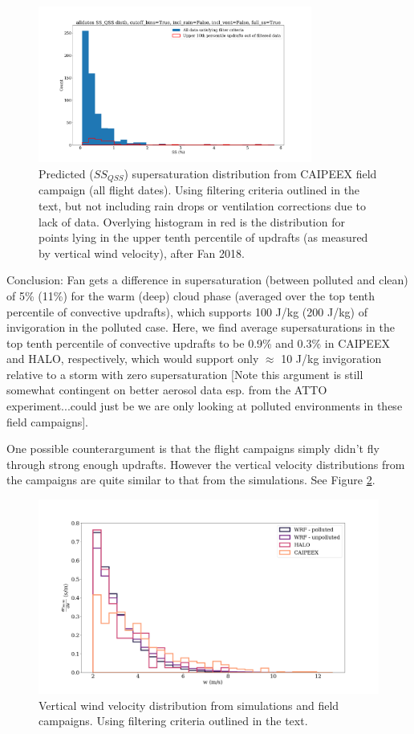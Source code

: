\documentclass{article}
\begin{document}
\begin{figure}[ht]
    \centering
    \includegraphics[width=9cm]{revcaipeex/v10_with_up10perc_ss_qss_hist_alldates_figure.png}
    \caption{Predicted ($SS_{QSS}$) supersaturation distribution from CAIPEEX field campaign (all flight dates). Using filtering criteria outlined in the text, but not including rain drops or ventilation corrections due to lack of data. Overlying histogram in red is the distribution for points lying in the upper tenth percentile of updrafts (as measured by vertical wind velocity), after Fan 2018.}
    \label{caipeexqsshist}
\end{figure}

Conclusion: Fan gets a difference in supersaturation (between polluted and clean) of 5\% (11\%) for the warm (deep) cloud phase (averaged over the top tenth percentile of convective updrafts), which supports 100 J/kg (200 J/kg) of invigoration in the polluted case. Here, we find average supersaturations in the top tenth percentile of convective updrafts to be 0.9\% and 0.3\% in CAIPEEX and HALO, respectively, which would support only $\approx$ 10 J/kg invigoration relative to a storm with zero supersaturation [Note this argument is still somewhat contingent on better aerosol data esp. from the ATTO experiment...could just be we are only looking at polluted environments in these field campaigns]. 

One possible counterargument is that the flight campaigns simply didn't fly through strong enough updrafts. However the vertical velocity distributions from the campaigns are quite similar to that from the simulations. See Figure \ref{combinedwhist}. 

\begin{figure}[ht]
    \centering
    \includegraphics[width=12cm]{revmywrf/v1_FINAL_combined_w_hist_figure.png}
    \caption{Vertical wind velocity distribution from simulations and field campaigns. Using filtering criteria outlined in the text.}
    \label{combinedwhist}
\end{figure}
\end{document}
